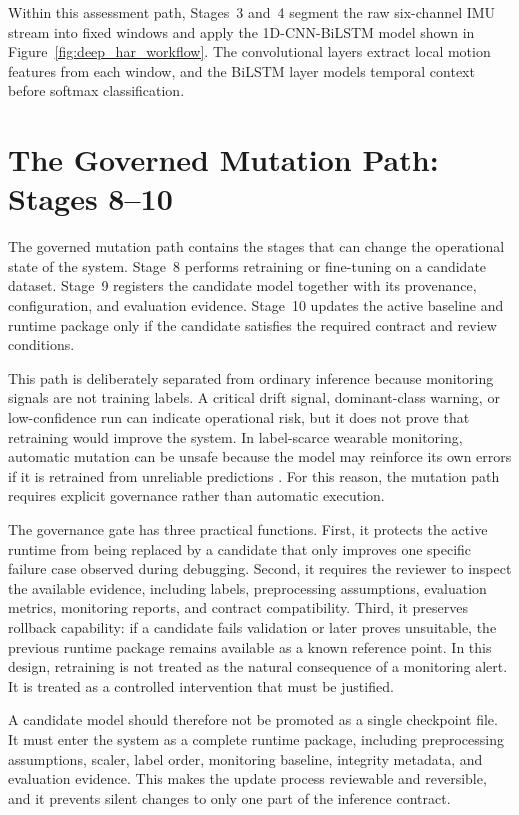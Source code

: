 Within this assessment path, Stages~3 and~4 segment the raw six-channel IMU stream into fixed windows and apply the 1D-CNN-BiLSTM model shown in Figure~\ref{fig:deep_har_workflow}. The convolutional layers extract local motion features from each window, and the BiLSTM layer models temporal context before softmax classification.


\section{The Governed Mutation Path: Stages 8--10}
\label{sec:governed_mutation_path}

The governed mutation path contains the stages that can change the operational state of the system. Stage~8 performs retraining or fine-tuning on a candidate dataset. Stage~9 registers the candidate model together with its provenance, configuration, and evaluation evidence. Stage~10 updates the active baseline and runtime package only if the candidate satisfies the required contract and review conditions.

This path is deliberately separated from ordinary inference because monitoring signals are not training labels. A critical drift signal, dominant-class warning, or low-confidence run can indicate operational risk, but it does not prove that retraining would improve the system. In label-scarce wearable monitoring, automatic mutation can be unsafe because the model may reinforce its own errors if it is retrained from unreliable predictions \cite{lee2013pseudolabel,arazo2020pseudolabel}. For this reason, the mutation path requires explicit governance rather than automatic execution.

The governance gate has three practical functions. First, it protects the active runtime from being replaced by a candidate that only improves one specific failure case observed during debugging. Second, it requires the reviewer to inspect the available evidence, including labels, preprocessing assumptions, evaluation metrics, monitoring reports, and contract compatibility. Third, it preserves rollback capability: if a candidate fails validation or later proves unsuitable, the previous runtime package remains available as a known reference point. In this design, retraining is not treated as the natural consequence of a monitoring alert. It is treated as a controlled intervention that must be justified.

A candidate model should therefore not be promoted as a single checkpoint file. It must enter the system as a complete runtime package, including preprocessing assumptions, scaler, label order, monitoring baseline, integrity metadata, and evaluation evidence. This makes the update process reviewable and reversible, and it prevents silent changes to only one part of the inference contract.



